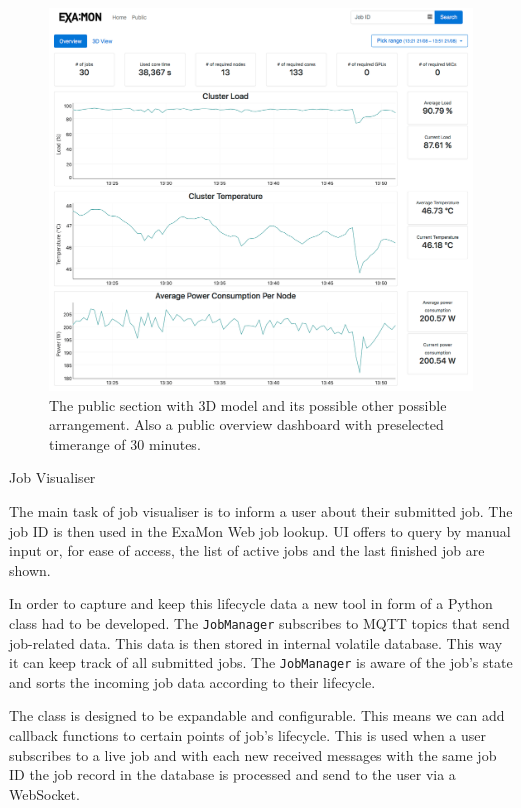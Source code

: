 \documentclass[a4paper, twoside]{article}
\newcommand{\highlight}[1]{\textcolor{prace-orange}{#1}}
\newcommand{\itempar}[1]{\noindent\highlight{\textsf #1}\par\noindent}
\begin{document}
\begin{multicols}{3}
\begin{figure}[t!]
\begin{minipage}[b]{\columnwidth}
        \includegraphics[width=\linewidth]{public-overview}
    \end{minipage}
    \caption*{The public section with 3D model and its possible other possible arrangement. Also a public overview dashboard with preselected timerange of 30 minutes.}
    \label{fig:3d}
\end{figure}

\itempar{Job Visualiser}
The main task of job visualiser is to inform a user about their submitted job. The job ID is then used in the ExaMon Web job lookup. UI offers to query by manual input or, for ease of access, the list of active jobs and the last finished job are shown.

In order to capture and keep this lifecycle data a new tool in form of a Python class had to be developed. The \texttt{JobManager} subscribes to MQTT topics that send job-related data. This data is then stored in internal volatile database. This way it can keep track of all submitted jobs. The \texttt{JobManager} is aware of the job's state and sorts the incoming job data according to their lifecycle.

The class is designed to be expandable and configurable. This means we can add callback functions to certain points of job's lifecycle. This is used when a user subscribes to a live job and with each new received messages with the same job ID the job record in the database is processed and send to the user via a WebSocket.


\end{multicols}
\end{document}
